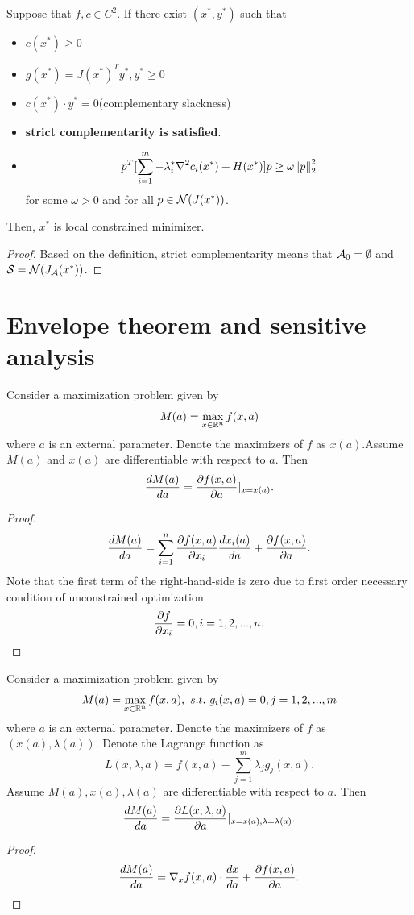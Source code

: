 \begin{refsection}
\begin{corollary}\cite[lec 4]{Robinson2015nonlinear2}
Suppose that $f,c\in C^2$. If there exist $(x^*,y^*)$ such that
\begin{itemize}
	\item $c(x^*)\geq 0$
	\item $g(x^*) = J(x^*)^Ty^*, y^*\geq 0$
	\item $c(x^*)\cdot y^* = 0$(complementary slackness)
	\item \textbf{strict complementarity is satisfied}.
	\item $$p^T[\sum_{i=1}^m -\lambda_i^* \nabla^2 c_i(x^*) + H(x^*)]p \geq \omega \norm{p}^2_2$$
	for some $\omega > 0$ and for all $p\in \mathcal{N}(J(x^*)) $.
\end{itemize}
Then, $x^*$ is local constrained minimizer.
\end{corollary}
\begin{proof}
Based on the definition, strict complementarity means that $\mathcal{A}_0 = \emptyset$ and $\mathcal{S} = \mathcal{N}(J_{\mathcal{A}}(x^*))$.
\end{proof}

\section{Envelope theorem and sensitive analysis}

\begin{lemma}\cite[369]{jiang2000advanced}
Consider a maximization problem given by
$$M(a) = \max_{x\in \mathbb{R}^n} f(x,a)$$
where $a$ is an external parameter.  Denote the maximizers of $f$ as $x(a)$.Assume $M(a)$ and $x(a)$ are differentiable with respect to $a$. Then
$$\frac{dM(a)}{da} = \frac{\partial f(x,a)}{\partial a}|_{x=x(a)}.$$
\end{lemma}
\begin{proof}
	$$\frac{dM(a)}{da} = \sum_{i=1}^n \frac{\partial f(x,a)}{\partial x_i}\frac{dx_i(a)}{da} + \frac{\partial f(x,a)}{\partial a}.$$
Note that the first term of the right-hand-side is zero due to first order necessary condition of unconstrained optimization
$$\frac{\partial f}{\partial x_i} = 0, i=1,2,...,n.$$	
\end{proof}


\begin{lemma}\cite[369]{jiang2000advanced}\cite[605]{jehle2011advanced}\label{ch:constrained-nonlinear-optimization:th:envelopeTheorem}
	Consider a maximization problem given by
$$M(a) = \max_{x\in \mathbb{R}^n} f(x,a), ~s.t.~ g_i(x,a) = 0, j=1,2,...,m$$
	where $a$ is an external parameter.  Denote the maximizers of $f$ as $(x(a),\lambda(a))$. Denote the Lagrange function as
	$$L(x,\lambda,a) = f(x,a) - \sum_{j=1}^m \lambda_j g_j(x,a).$$
	Assume $M(a), x(a), \lambda(a)$ are differentiable with respect to $a$.
	Then
	$$\frac{dM(a)}{da} = \frac{\partial L(x,\lambda,a)}{\partial a}|_{x=x(a), \lambda = \lambda(a)}.$$
\end{lemma}
\begin{proof}
	$$\frac{dM(a)}{da} = \nabla_x f(x,a) \cdot \frac{dx}{da} + \frac{\partial f(x,a)}{\partial a}.$$
	

\end{proof}
\end{refsection}
